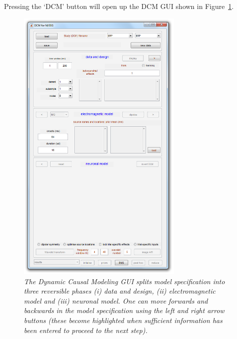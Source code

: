 Pressing the `DCM' button will open up the DCM GUI shown in Figure~\ref{dcm_gui}.
\begin{figure}
\begin{center}
\includegraphics[width=80mm]{mmn/dcm_gui}
\caption{\em The Dynamic Causal Modeling GUI splits model specification into three reversible phases (i) data and design, (ii) electromagnetic model and (iii) neuronal model. One can move forwards and backwards in the model specification using the left and right arrow buttons (these become highlighted when sufficient information has been entered to proceed to the next step).
\label{dcm_gui}}
\end{center}
\end{figure}
